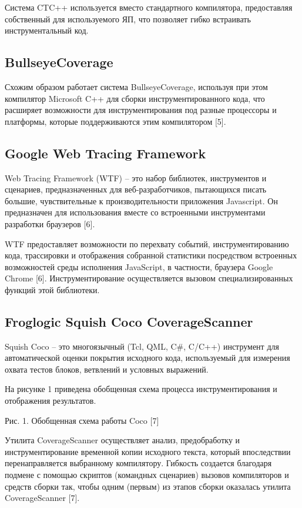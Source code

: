 Система CTC++ используется вместо стандартного компилятора, предоставляя собственный для используемого ЯП, что позволяет гибко встраивать инструментальный код.

\subsection{BullseyeCoverage}
Схожим образом работает система BullseyeCoverage, используя при этом компилятор Microsoft C++ для сборки инструментированного кода, что расширяет возможности для инструментирования под разные процессоры и платформы, которые поддерживаются этим компилятором [5].

\subsection{Google Web Tracing Framework}
Web Tracing Framework (WTF) -- это набор библиотек, инструментов и сценариев, предназначенных для веб-разработчиков, пытающихся писать большие, чувствительные к производительности приложения Javascript. Он предназначен для использования вместе со встроенными инструментами разработки браузеров [6]. 

WTF предоставляет возможности по перехвату событий, инструментированию кода, трассировки и отображения собранной статистики посредством встроенных возможностей среды исполнения JavaScript, в частности, браузера Google Chrome [6]. Инструментирование осуществляется вызовом специализированных функций этой библиотеки.

\subsection{Froglogic Squish Coco CoverageScanner}
Squish Coco -- это многоязычный (Tcl, QML, C\#, C/C++) инструмент для автоматической оценки покрытия исходного кода, используемый для измерения охвата тестов блоков, ветвлений и условных выражений.

На рисунке 1 приведена обобщенная схема процесса инструментирования и отображения результатов.
 
Рис. 1. Обобщенная схема работы Coco [7]

Утилита CoverageScanner осуществляет анализ, предобработку и инструментирование временной копии исходного текста, который впоследствии перенаправляется выбранному компилятору. Гибкость создается благодаря подмене с помощью скриптов (командных сценариев) вызовов компиляторов и средств сборки так, чтобы одним (первым) из этапов сборки оказалась утилита CoverageScanner [7].

